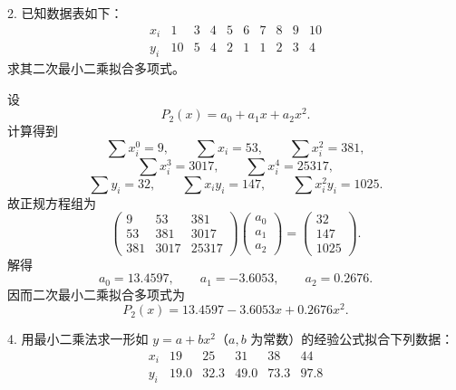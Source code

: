 \documentclass[11pt, a4paper]{ctexart}
\begin{document}
\begin{problem}{2. 已知数据表如下：}
    \[
        \begin{array}{c|ccccccccc}
            x_i & 1 & 3 & 4 & 5 & 6 & 7 & 8 & 9 & 10 \\ \hline
            y_i & 10 & 5 & 4 & 2 & 1 & 1 & 2 & 3 & 4
        \end{array}
    \]
    求其二次最小二乘拟合多项式。
\end{problem}

\begin{solution}
    设
    \[
        P_2(x)=a_0+a_1x+a_2x^2.
    \]
    计算得到
    \[
        \sum x_i^0=9,\qquad \sum x_i=53,\qquad \sum x_i^2=381,
    \]
    \[
        \sum x_i^3=3017,\qquad \sum x_i^4=25317,
    \]
    \[
        \sum y_i=32,\qquad \sum x_iy_i=147,\qquad \sum x_i^2y_i=1025.
    \]
    故正规方程组为
    \[
        \begin{pmatrix}
            9 & 53 & 381 \\
            53 & 381 & 3017 \\
            381 & 3017 & 25317
        \end{pmatrix}
        \begin{pmatrix}
            a_0 \\
            a_1 \\
            a_2
        \end{pmatrix}
        =
        \begin{pmatrix}
            32 \\
            147 \\
            1025
        \end{pmatrix}.
    \]
    解得
    \[
        a_0=13.4597,\qquad a_1=-3.6053,\qquad a_2=0.2676.
    \]
    因而二次最小二乘拟合多项式为
    \[
        P_2(x)=13.4597-3.6053x+0.2676x^2.
    \]
\end{solution}


\begin{problem}{4. 用最小二乘法求一形如 $y=a+bx^2$（$a,b$ 为常数）的经验公式拟合下列数据：}
    \[
        \begin{array}{c|ccccc}
            x_i & 19 & 25 & 31 & 38 & 44 \\ \hline
            y_i & 19.0 & 32.3 & 49.0 & 73.3 & 97.8
        \end{array}
    \]
\end{problem}
\end{document}
